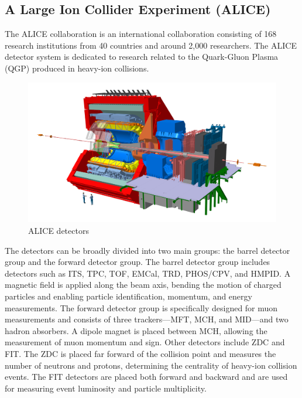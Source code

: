         \subsection{A Large Ion Collider Experiment (ALICE)}
        The ALICE collaboration is an international collaboration consisting of 168 research institutions from 40 countries and around 2,000 researchers. The ALICE detector system is dedicated to research related to the Quark-Gluon Plasma (QGP) produced in heavy-ion collisions.
        \begin{figure}[htbp]
            \centering
            \includegraphics[keepaspectratio, scale=0.2]{fig/2_1_ALICE_RUN3_detectors.jpg}
            \caption{ALICE detectors}
            \label{ALICE_detectors}
        \end{figure}
        The detectors can be broadly divided into two main groups: the barrel detector group and the forward detector group.
        The barrel detector group includes detectors such as ITS, TPC, TOF, EMCal, TRD, PHOS/CPV, and HMPID. A magnetic field is applied along the beam axis, bending the motion of charged particles and enabling particle identification, momentum, and energy measurements. The forward detector group is specifically designed for muon measurements and consists of three trackers—MFT, MCH, and MID—and two hadron absorbers. A dipole magnet is placed between MCH, allowing the measurement of muon momentum and sign. Other detectors include ZDC and FIT. The ZDC is placed far forward of the collision point and measures the number of neutrons and protons, determining the centrality of heavy-ion collision events. The FIT detectors are placed both forward and backward and are used for measuring event luminosity and particle multiplicity.

